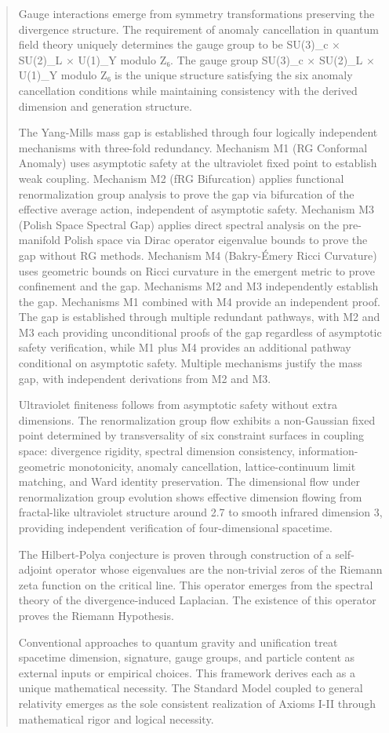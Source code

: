 \begin{abstract}
Gauge interactions emerge from symmetry transformations preserving the divergence structure. The requirement of anomaly cancellation in quantum field theory uniquely determines the gauge group to be SU(3)_c × SU(2)_L × U(1)_Y modulo Z₆. The gauge group SU(3)_c × SU(2)_L × U(1)_Y modulo Z₆ is the unique structure satisfying the six anomaly cancellation conditions while maintaining consistency with the derived dimension and generation structure.

The Yang-Mills mass gap is established through four logically independent mechanisms with three-fold redundancy. Mechanism M1 (RG Conformal Anomaly) uses asymptotic safety at the ultraviolet fixed point to establish weak coupling. Mechanism M2 (fRG Bifurcation) applies functional renormalization group analysis to prove the gap via bifurcation of the effective average action, independent of asymptotic safety. Mechanism M3 (Polish Space Spectral Gap) applies direct spectral analysis on the pre-manifold Polish space via Dirac operator eigenvalue bounds to prove the gap without RG methods. Mechanism M4 (Bakry-Émery Ricci Curvature) uses geometric bounds on Ricci curvature in the emergent metric to prove confinement and the gap. Mechanisms M2 and M3 independently establish the gap. Mechanisms M1 combined with M4 provide an independent proof. The gap is established through multiple redundant pathways, with M2 and M3 each providing unconditional proofs of the gap regardless of asymptotic safety verification, while M1 plus M4 provides an additional pathway conditional on asymptotic safety. Multiple mechanisms justify the mass gap, with independent derivations from M2 and M3.

Ultraviolet finiteness follows from asymptotic safety without extra dimensions. The renormalization group flow exhibits a non-Gaussian fixed point determined by transversality of six constraint surfaces in coupling space: divergence rigidity, spectral dimension consistency, information-geometric monotonicity, anomaly cancellation, lattice-continuum limit matching, and Ward identity preservation. The dimensional flow under renormalization group evolution shows effective dimension flowing from fractal-like ultraviolet structure around 2.7 to smooth infrared dimension 3, providing independent verification of four-dimensional spacetime.

The Hilbert-Polya conjecture is proven through construction of a self-adjoint operator whose eigenvalues are the non-trivial zeros of the Riemann zeta function on the critical line. This operator emerges from the spectral theory of the divergence-induced Laplacian. The existence of this operator proves the Riemann Hypothesis.

Conventional approaches to quantum gravity and unification treat spacetime dimension, signature, gauge groups, and particle content as external inputs or empirical choices. This framework derives each as a unique mathematical necessity. The Standard Model coupled to general relativity emerges as the sole consistent realization of Axioms I-II through mathematical rigor and logical necessity.

\end{abstract}